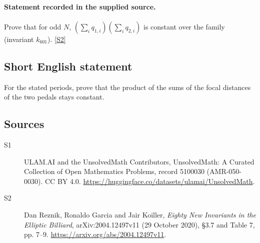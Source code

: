 \documentclass[11pt]{article}
\newcommand{\sref}[2]{\hyperlink{source:#1:#2}{[S#2]}}
\begin{document}
\paragraph{Statement recorded in the supplied source.}
Prove that for odd $N$, $(\sum_iq_{1,i})(\sum_iq_{2,i})$ is constant over the family (invariant $k_{601}$). \sref{5100030}{2}
\subsection{Short English statement}
For the stated periods, prove that the product of the sums of the focal distances of the two pedals stays constant.
\subsection{Sources}
\begin{description}
\item[\hypertarget{source:5100030:1}{S1}] ULAM.AI and the UnsolvedMath Contributors, UnsolvedMath: A Curated Collection of Open Mathematics Problems, record 5100030 (AMR-050-0030). CC BY 4.0. \url{https://huggingface.co/datasets/ulamai/UnsolvedMath}.
\item[\hypertarget{source:5100030:2}{S2}] Dan Reznik, Ronaldo Garcia and Jair Koiller, \emph{Eighty New Invariants in the Elliptic Billiard}, arXiv:2004.12497v11 (29 October 2020), \S3.7 and Table 7, pp. 7--9. \url{https://arxiv.org/abs/2004.12497v11}.
\end{description}
\label{end:5100030}
\end{document}
